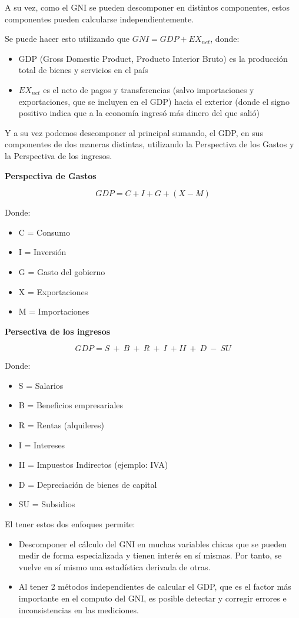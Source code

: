 A su vez, como el GNI se pueden descomponer en distintos componentes, estos componentes pueden calcularse independientemente.

Se puede hacer esto utilizando que $GNI = GDP + EX_{net}$, donde:
\begin{itemize}
    \item GDP (Gross Domestic Product, Producto Interior Bruto) es la producción total de bienes y servicios en el país
    \item $EX_{net}$ es el neto de pagos y transferencias (salvo importaciones y exportaciones, que se incluyen en el GDP) hacia el exterior (donde el signo positivo indica que a la economía ingresó más dinero del que salió)
\end{itemize}

Y a su vez podemos descomponer al principal sumando, el GDP, en sus componentes de dos maneras distintas, utilizando la Perspectiva de los Gastos y la Perspectiva de los ingresos.

\textbf{Perspectiva de Gastos}

$$
GDP = C + I + G + (X-M)
$$

Donde:
\begin{itemize}
    \item C = Consumo
    \item I = Inversión
    \item G = Gasto del gobierno
    \item X = Exportaciones
    \item M = Importaciones
\end{itemize}

\textbf{Persectiva de los ingresos}

$$
GDP = S\ +\ B\ +\ R\ +\ I\ + II\ +\ D\ -\ SU 
$$

Donde:
\begin{itemize}
    \item S = Salarios
    \item B = Beneficios empresariales
    \item R = Rentas (alquileres)
    \item I = Intereses
    \item II = Impuestos Indirectos (ejemplo: IVA)
    \item D = Depreciación de bienes de capital
    \item SU = Subsidios
\end{itemize}

El tener estos dos enfoques permite:

\begin{itemize}
    \item Descomponer el cálculo del GNI en muchas variables chicas que se pueden medir de forma especializada y tienen interés en sí mismas. Por tanto, se vuelve en sí mismo una estadística derivada de otras.
    \item Al tener 2 métodos independientes de calcular el GDP, que es el factor más importante en el computo del GNI, es posible detectar y corregir errores e inconsistencias en las mediciones.
\end{itemize}

